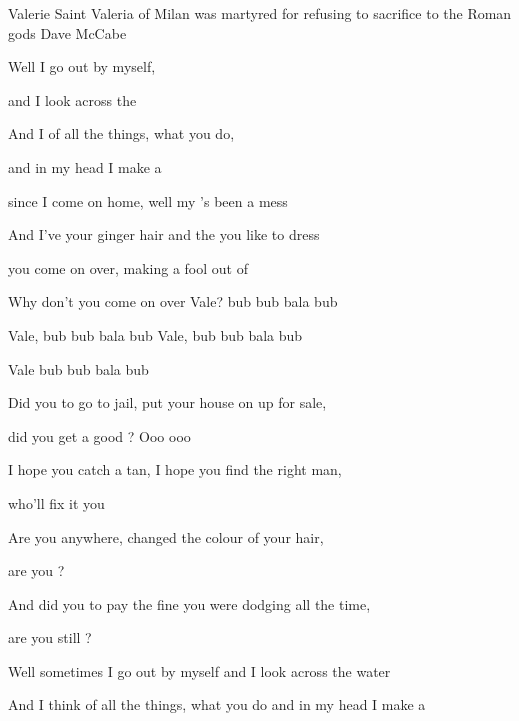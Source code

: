 \begin{SBSong}{Valerie}
  {Saint Valeria of Milan was martyred for refusing to sacrifice to the Roman gods}
  {Dave McCabe}
  \begin{SBVerse}
    Well  I go out by myself,

    and I look across the 

    And I  of all the things, what you do, 

    and in my head I make a 
  \end{SBVerse}
  \begin{SBChorus}
     since I come on home, well my 's been a mess
    
    And I've  your ginger hair and the  you like to dress
    
     you come on over,  making a fool out of 
    
    Why don't you come on over Vale? bub bub bala bub
    
    Vale,  bub bub bala bub Vale,  bub bub bala bub 
    
    Vale  bub bub bala bub
  \end{SBChorus}
  \begin{SBVerse}
    Did you  to go to jail, put your house on up for sale, 

    did you get a good ?  Ooo ooo
    
    I hope you  catch a tan, I hope you find the right man,
    
    who'll fix it  you
    
    Are you  anywhere, changed the colour of your hair, 

    are you ?
    
    And did you  to pay the fine you were dodging all the time,

   are you still ?
  \end{SBVerse}
  \begin{SBVerse*}
  
    Well sometimes I go out by myself and I look across the water
    
    And I think of all the things, what you do and in my head I make a 
  \end{SBVerse*}
\end{SBSong}